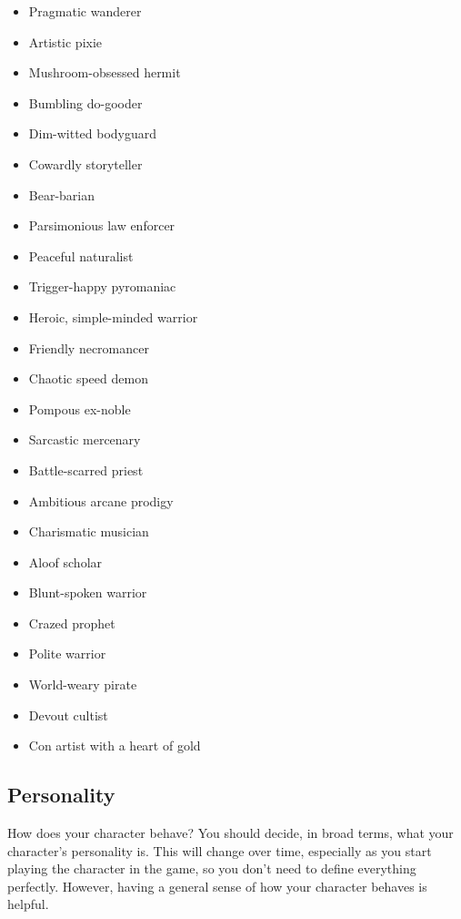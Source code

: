         \begin{itemize}
            \item Pragmatic wanderer
            \item Artistic pixie
            \item Mushroom-obsessed hermit
            \item Bumbling do-gooder
            \item Dim-witted bodyguard
            \item Cowardly storyteller
            \item Bear-barian
            \item Parsimonious law enforcer
            \item Peaceful naturalist
            \item Trigger-happy pyromaniac
            \item Heroic, simple-minded warrior
            \item Friendly necromancer
            \item Chaotic speed demon
            \item Pompous ex-noble
            \item Sarcastic mercenary
            \item Battle-scarred priest
            \item Ambitious arcane prodigy
            \item Charismatic musician
            \item Aloof scholar
            \item Blunt-spoken warrior
            \item Crazed prophet
            \item Polite warrior
            \item World-weary pirate
            \item Devout cultist
            \item Con artist with a heart of gold
        \end{itemize}

    \subsection{Personality}

        How does your character behave?
        You should decide, in broad terms, what your character's personality is.
        This will change over time, especially as you start playing the character in the game, so you don't need to define everything perfectly.
        However, having a general sense of how your character behaves is helpful.


